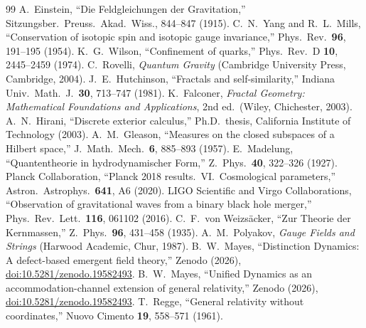 \documentclass[11pt,twocolumn]{article}
\begin{document}
\begin{thebibliography}{99}
 A.~Einstein, ``Die Feldgleichungen der Gravitation,'' Sitzungsber.\ Preuss.\ Akad.\ Wiss., 844--847 (1915).
 C.~N.~Yang and R.~L.~Mills, ``Conservation of isotopic spin and isotopic gauge invariance,'' Phys.\ Rev.\ \textbf{96}, 191--195 (1954).
 K.~G.~Wilson, ``Confinement of quarks,'' Phys.\ Rev.\ D \textbf{10}, 2445--2459 (1974).
 C.~Rovelli, \textit{Quantum Gravity} (Cambridge University Press, Cambridge, 2004).
 J.~E.~Hutchinson, ``Fractals and self-similarity,'' Indiana Univ.\ Math.\ J.\ \textbf{30}, 713--747 (1981).
 K.~Falconer, \textit{Fractal Geometry: Mathematical Foundations and Applications}, 2nd ed.\ (Wiley, Chichester, 2003).
 A.~N.~Hirani, ``Discrete exterior calculus,'' Ph.D.\ thesis, California Institute of Technology (2003).
 A.~M.~Gleason, ``Measures on the closed subspaces of a Hilbert space,'' J.\ Math.\ Mech.\ \textbf{6}, 885--893 (1957).
 E.~Madelung, ``Quantentheorie in hydrodynamischer Form,'' Z.\ Phys.\ \textbf{40}, 322--326 (1927).
 Planck Collaboration, ``Planck 2018 results.\ VI.\ Cosmological parameters,'' Astron.\ Astrophys.\ \textbf{641}, A6 (2020).
 LIGO Scientific and Virgo Collaborations, ``Observation of gravitational waves from a binary black hole merger,'' Phys.\ Rev.\ Lett.\ \textbf{116}, 061102 (2016).
 C.~F.~von Weizs\"acker, ``Zur Theorie der Kernmassen,'' Z.\ Phys.\ \textbf{96}, 431--458 (1935).
 A.~M.~Polyakov, \textit{Gauge Fields and Strings} (Harwood Academic, Chur, 1987).
 B.~W.~Mayes, ``Distinction Dynamics: A defect-based emergent field theory,'' Zenodo (2026), \href{https://doi.org/10.5281/zenodo.19582493}{doi:10.5281/zenodo.19582493}.
 B.~W.~Mayes, ``Unified Dynamics as an accommodation-channel extension of general relativity,'' Zenodo (2026), \href{https://doi.org/10.5281/zenodo.19582493}{doi:10.5281/zenodo.19582493}.
 T.~Regge, ``General relativity without coordinates,'' Nuovo Cimento \textbf{19}, 558--571 (1961).
\end{thebibliography}
\end{document}
